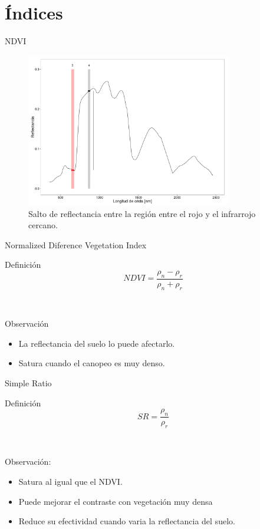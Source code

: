 \documentclass[handout]{beamer}
\begin{document}
\section{Índices}
\begin{frame}{NDVI}
    \begin{figure}
    \centering
    \includegraphics[width=0.8\textwidth]{imagenes/salto_nr.png}
    \caption{Salto de reflectancia entre la región entre el rojo y el infrarrojo cercano.}
    \end{figure}
\end{frame}
\begin{frame}{Normalized Diference Vegetation Index}
  \begin{block}{Definición}
      \begin{equation}
          NDVI = \frac{\rho_n-\rho_r}{\rho_n+\rho_r}
      \end{equation}
  \end{block}\pause\
    \begin{block}{Observación}
        \begin{itemize}[<+->]
            \item La reflectancia del suelo lo puede afectarlo.
            \item Satura cuando el canopeo es muy denso.
        \end{itemize}
    \end{block}
\end{frame}

\begin{frame}{Simple Ratio}
  \begin{block}{Definición}
    \begin{equation}
    SR=\frac{\rho_n}{\rho_r}
    \end{equation}
  \end{block}\pause\
  \begin{block}{Observación:}
      \begin{itemize}[<+->]
        \item Satura al igual que el NDVI\@.
        \item Puede mejorar el contraste con vegetación muy densa
        \item Reduce su efectividad cuando varia la reflectancia del suelo.
    \end{itemize}
  \end{block}
\end{frame}
\end{document}
